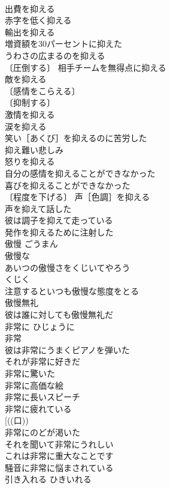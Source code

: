 \documentclass[8pt]{extreport}
\begin{document}
\begin{CJK}{UTF8}{min}
\\	出費を抑える 
\\	赤字を低く抑える 
\\	輸出を抑える 
\\	増資額を30パーセントに抑えた 
\\	うわさの広まるのを抑える 
\\	〔圧倒する〕 相手チームを無得点に抑える 
\\	敵を抑える 
\\	〔感情をこらえる〕
\\	〔抑制する〕
\\	激情を抑える 
\\	涙を抑える 
\\	笑い［あくび］を抑えるのに苦労した 
\\	抑え難い悲しみ 
\\	怒りを抑える 
\\	自分の感情を抑えることができなかった 
\\	喜びを抑えることができなかった 
\\	〔程度を下げる〕 声［色調］を抑える 
\\	声を抑えて話した 
\\	彼は調子を抑えて走っている 
\\	発作を抑えるために注射した 
\\	傲慢	ごうまん	
\\	傲慢な 
\\	あいつの傲慢さをくじいてやろう
\\	くじく 
\\	注意するといつも傲慢な態度をとる 
\\	傲慢無礼 
\\	彼は誰に対しても傲慢無礼だ 
\\	非常に	ひじょうに	
\\	非常 
\\	彼は非常にうまくピアノを弾いた 
\\	それが非常に好きだ 
\\	非常に驚いた 
\\	非常に高価な絵 
\\	非常に長いスピーチ 
\\	非常に疲れている 
\\	[((口)) 
\\	非常にのどが渇いた 
\\	それを聞いて非常にうれしい 
\\	これは非常に重大なことです 
\\	騒音に非常に悩まされている 
\\	引き入れる	ひきいれる	

\end{CJK}
\end{document}
